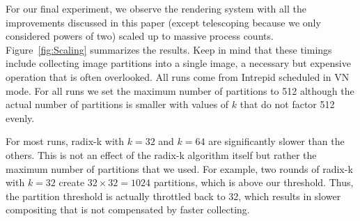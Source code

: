 \documentclass{sig-alternate}
\begin{document}
For our final experiment, we observe the rendering system with all the
improvements discussed in this paper (except telescoping because we only
considered powers of two) scaled up to massive process counts.
Figure~\ref{fig:Scaling} summarizes the results.  Keep in mind that these
timings include collecting image partitions into a single image, a
necessary but expensive operation that is often overlooked.  All runs come
from Intrepid scheduled in VN mode.  For all runs we set the maximum number
of partitions to 512 although the actual number of partitions is smaller
with values of $k$ that do not factor 512 evenly.

For most runs, radix-k with $k=32$ and $k=64$ are significantly slower than
the others.  This is not an effect of the radix-k algorithm itself but
rather the maximum number of partitions that we used.  For example, two
rounds of radix-k with $k=32$ create $32 \times 32 = 1024$ partitions,
which is above our threshold.  Thus, the partition threshold is actually
throttled back to 32, which results in slower compositing that is not
compensated by faster collecting.
\end{document}
